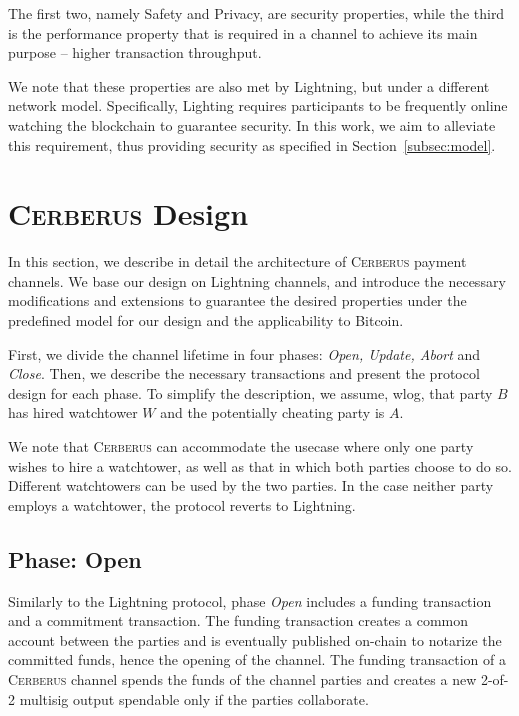 \documentclass[twocolumn,showpacs,%
  nofootinbib,aps,superscriptaddress,%
  eqsecnum,prd,notitlepage,showkeys,10pt]{revtex4-1}
\newcommand{\authnote}[3]{{ \footnotesize \bf{#1[#2: #3]~}}} %
\newcommand{\edit}[1]{\authnote{\color{blue}}{edit}{#1}}
\newcommand{\sys}{\textsc{Cerberus}\xspace}
\begin{document}
The first two, namely Safety and Privacy, are security properties, while the third is the performance property that is required in a channel to achieve its main purpose -- higher transaction throughput.

We note that these properties are also met by Lightning, but under a different network model. Specifically, Lighting requires participants to be frequently online watching the blockchain to guarantee security. In this work, we aim to alleviate this requirement, thus providing security as specified in Section~\ref{subsec:model}.






\section{\sys Design}\label{sec:design}

In this section, we describe in detail the architecture of \sys payment channels. We base our design on Lightning channels, and introduce the necessary modifications and extensions to guarantee the desired properties under the predefined model for our design and the applicability to Bitcoin.

First, we divide the channel lifetime in four phases: \textit{Open, Update, Abort} and \textit{Close}. Then, we describe the necessary transactions  and present the protocol design for each phase.
To simplify the description, we assume, wlog, that party $B$ has hired watchtower $W$ and the potentially cheating party is $A$.

We note that \sys can accommodate the usecase where only one party wishes to hire a watchtower, as well as that in which both parties choose to do so. Different watchtowers can be used by the two parties. In the case neither party employs a watchtower, the protocol reverts to Lightning.


\subsection{Phase: Open}\label{subsec:open}
Similarly to the Lightning protocol, phase \textit{Open} includes a funding transaction and a commitment transaction.
The funding transaction creates a common account between the parties and is eventually published on-chain to notarize the committed funds, hence the opening of the channel. The funding transaction of a \sys channel spends the funds of the channel parties and creates a new 2-of-2 multisig output spendable only if the parties collaborate.
\end{document}
